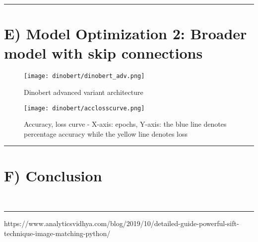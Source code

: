 \documentclass[conference]{IEEEtran}
\begin{document}

\vspace{0.5cm} \hrule{} \vspace{0.5cm}
\section*{\textbf{E) Model Optimization 2: Broader model with skip connections}}
\label{dinobertadv}

\begin{figure*}
    \centering
    \texttt{[image: dinobert/dinobert\_adv.png]}
    \caption{Dinobert advanced variant architecture}
    \label{dinobert_adv}
\end{figure*}

\begin{figure}
    \centering
    \texttt{[image: dinobert/acclosscurve.png]}
    \caption{Accuracy, loss curve - X-axis: epochs, Y-axis: the blue line denotes percentage accuracy while the yellow line denotes loss}
\end{figure}

\vspace{0.5cm} \hrule{} \vspace{0.5cm}
\section*{\textbf{F) Conclusion}}
\label{conclusion}


\

\vspace{0.5cm} \hrule{} \vspace{0.5cm}
\begin{thebibliography}{00}
 https://www.analyticsvidhya.com/blog/2019/10/detailed-guide-powerful-sift-technique-image-matching-python/
\end{thebibliography}
\vspace{12pt}
\end{document}

